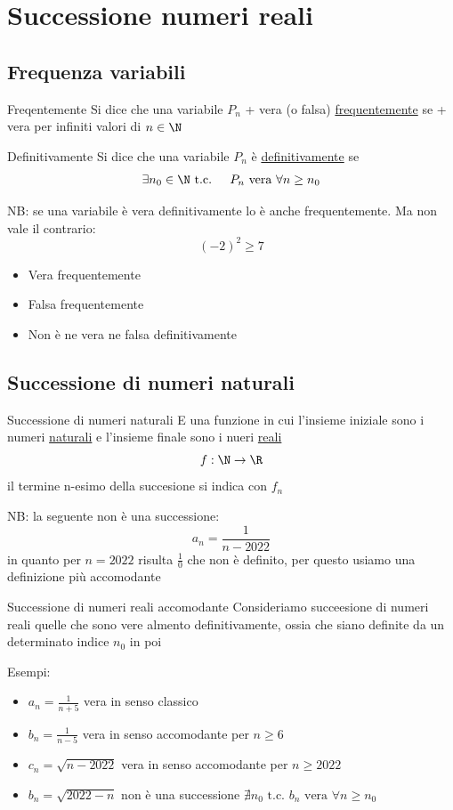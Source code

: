 \section{Successione numeri reali}
\subsection{Frequenza variabili}

\begin{definizione}{Freqentemente}
	Si dice che una variabile $ P_n$ + vera (o falsa) \underline{frequentemente} se + vera per infiniti valori di $n  \in \N$
\end{definizione}

\begin{definizione}{Definitivamente}
	Si dice che una variabile $P_n$ è \underline{definitivamente} se \[
		\exists n_0  \in \N \text{ t.c. } \quad P_n \text{ vera } \forall n \ge n_0
	\]
\end{definizione}

NB: se una variabile è vera definitivamente lo è anche frequentemente. Ma non vale il contrario: \[
	\left( -2 \right) ^2 \ge 7
\]
\begin{itemize}
	\item Vera frequentemente
	\item Falsa frequentemente
	\item Non è ne vera ne falsa definitivamente
\end{itemize}
\subsection{Successione di numeri naturali}
\begin{definizione}{Successione di numeri naturali}
	E una funzione in cui l'insieme iniziale sono i numeri \underline{naturali} e l'insieme finale sono i nueri \underline{reali} \[
		f: \N \rightarrow \R
	\]
	il termine n-esimo della succesione si indica con $f_n$
\end{definizione}
NB: la seguente non è una successione:
\[
	a_n = \frac{1}{n-2022}
\]
in quanto per $n=2022$ risulta $\frac{1}{0}$ che non è definito, per questo usiamo una definizione più accomodante

\begin{definizione}{Successione di numeri reali accomodante}
	Consideriamo succeesione di numeri reali quelle che sono vere almento definitivamente, ossia che siano definite da un determinato indice $ n_0$ in poi
\end{definizione}
Esempi:
\begin{itemize}
	\item $a_n = \frac{1}{n+5}$ \quad vera in senso classico
	\item $b_n= \frac{1}{n-5}$ \quad vera in senso accomodante per $n\ge 6$
	\item $c_n= \sqrt{n-2022} $ \quad vera in senso accomodante per $n \ge 2022$
	\item $b_n= \sqrt{2022-n} $ \quad non è una successione \rarr $\nexists n_0 \text{ t.c. }b_n \text{ vera } \forall n \ge n_0$
\end{itemize}
